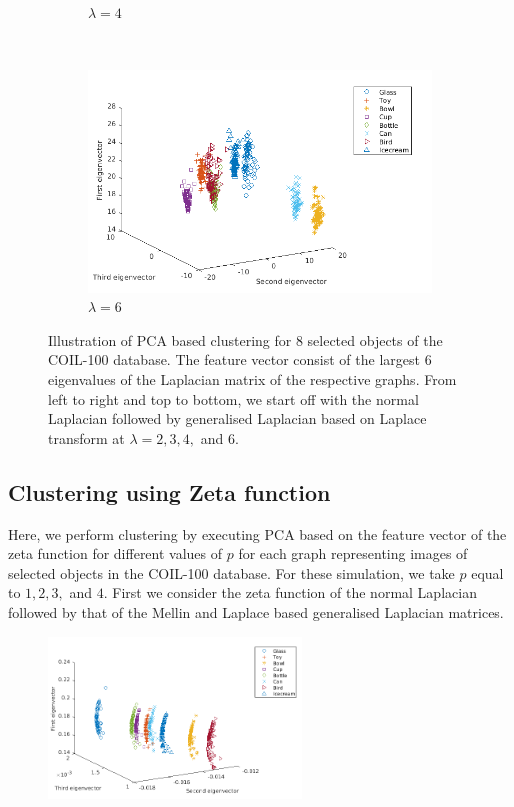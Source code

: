 \documentclass[10pt,a4paper]{article}
\theoremstyle{plain}
\theoremstyle{definition}
\begin{document}
\begin{figure}[H]
\begin{subfigure}[b]{0.5\textwidth}
		\caption{$\lambda=4$}
		\label{}
	\end{subfigure}~
	\begin{subfigure}[b]{0.5\textwidth}
		\includegraphics[width= \textwidth]{images/Laplace-lam6.png}
		\caption{$\lambda=6$}
		\label{}
	\end{subfigure}
	\caption{Illustration of PCA based clustering for $8$ selected objects of the COIL-100 database. The feature vector consist of the largest $6$ eigenvalues of the Laplacian matrix of the respective graphs. From left to right and top to bottom, we start off with the normal Laplacian followed by generalised Laplacian based on Laplace transform at $\lambda =2,3,4,$ and $6$. }
	\label{}
\end{figure}


\subsection{Clustering using Zeta function}
Here, we perform clustering by executing PCA based on the feature vector of the zeta function for different values of $p$ for each graph representing images of selected objects in the COIL-100 database. For these simulation, we take $p$ equal to $1,2,3,$ and $4$. First we consider the zeta function of the normal Laplacian followed by that of the Mellin and Laplace based generalised Laplacian matrices.
\begin{figure}[H]
	\centering
	\includegraphics[width=0.6\textwidth]{images/Zeta-nolongrange.png}
	\caption{}
	\label{}
\end{figure}
\end{document}
